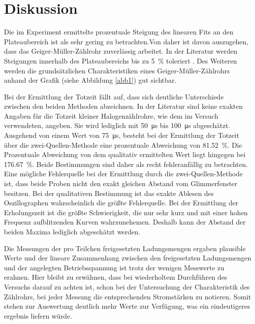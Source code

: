 \section{Diskussion}

Die im Experiment ermittelte prozentuale Steigung des linearen Fits an den Plateaubereich ist als sehr gering zu betrachten.Von daher
ist davon auszugehen, dass das Geiger-Müller-Zählrohr zuverlässig arbeitet. In der Literatur werden Steigungen innerhalb des Plateaubereichs bis
zu \SI{5}{\percent} toleriert \cite{Q2}.
Des Weiteren werden die grundsätzlichen Charakteristiken eines Geiger-Müller-Zählrohrs anhand der Grafik (siehe Abbildung \ref{abb1}) gut sichtbar.

\noindent Bei der Ermittlung der Totzeit fällt auf, dass sich deutliche Unterschiede zwischen den beiden Methoden abzeichnen.
In der Literatur \cite{Q2} sind keine exakten Angaben für die Totzeit kleiner Halogenzählrohre, wie dem im Versuch verwendeten, angeben.
Sie wird lediglich mit \SI{50}{\micro \second} bis \SI{100}{\micro \second} abgeschätzt.
Ausgehend von einem Wert von \SI{75}{\micro \second}, besteht bei der Ermittlung der Totzeit über die
zwei-Quellen-Methode eine prozentuale Abweichung von \SI{81,52}{\percent}. Die Prozentuale Abweichung von dem qualitativ ermittelten Wert
liegt hingegen bei \SI{176,67}{\percent}. Beide Bestimmungen sind daher als recht fehleranfällig zu betrachten.
Eine mögliche Fehlerquelle bei der Ermittlung durch die zwei-Quellen-Methode ist, dass beide Proben nicht den exakt gleichen Abstand vom
Glimmerfenster besitzen. Bei der qualitativen Bestimmung ist das exakte Ablesen des Oszillographen wahrscheinlich die größte Fehlerquelle.
Bei der Ermittlung der Erholungszeit ist die größte Schwierigkeit, die nur sehr kurz und mit einer hohen Frequenz aufblitzenden Kurven
wahrzunehemen. Deshalb kann der Abstand der beiden Maxima lediglich abgeschätzt werden.

\noindent Die Messungen der pro Teilchen freigesetzten Ladungsmengen ergaben plausible Werte und der lineare Zusammenhang zwischen den freigesetzten
Ladungsmengen und der angelegten Betriebsspannung ist trotz der wenigen Messwerte zu erahnen.
Hier bleibt zu erwähnen, dass bei wiederholtem Durchführen des Versuchs darauf zu achten ist, schon bei der Untersuchung der Charakteristik
des Zählrohrs, bei jeder Messung die entsprechenden Stromstärken zu notieren. Somit stehen zur Auswertung deutlich mehr Werte zur Verfügung,
was ein eindeutigeres ergebnis liefern würde.



\newpage
\nocite{*}
\printbibliography
